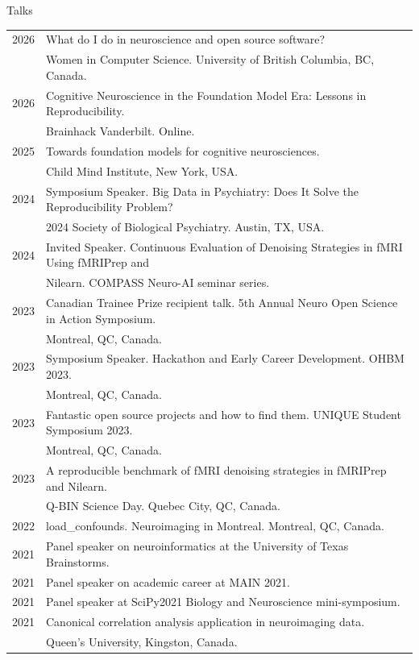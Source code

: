 \documentclass{resume} %
\begin{document}
\begin{rSection}{Talks}
  \begin{tabular}{@{} l l @{\hspace{10ex}}}
    2026 & What do I do in neuroscience and open source software? \\
    & Women in Computer Science. University of British Columbia, BC, Canada. \\
    2026 & Cognitive Neuroscience in the Foundation Model Era: Lessons in Reproducibility. \\
    & Brainhack Vanderbilt. Online. \\
    2025 & Towards foundation models for cognitive neurosciences. \\
 	  &Child Mind Institute, New York, USA. \\
    2024 & Symposium Speaker. Big Data in Psychiatry: Does It Solve the Reproducibility Problem? \\ & 2024 Society of Biological Psychiatry. Austin, TX, USA.\\
    2024 & Invited Speaker. Continuous Evaluation of Denoising Strategies in fMRI Using fMRIPrep and\\
 	  &Nilearn. COMPASS Neuro-AI seminar series.\\
    2023 & Canadian Trainee Prize recipient talk. 5th Annual Neuro Open Science in Action Symposium. \\ & Montreal, QC, Canada.\\
    2023 & Symposium Speaker. Hackathon and Early Career Development. OHBM 2023. \\&Montreal, QC, Canada.\\
    2023 & Fantastic open source projects and how to find them. UNIQUE Student Symposium 2023. \\&Montreal, QC, Canada.\\
    2023 & A reproducible benchmark of fMRI denoising strategies in fMRIPrep and Nilearn. \\ & Q-BIN Science Day. Quebec City, QC, Canada.\\
   	2022 & load\_confounds. Neuroimaging in Montreal. Montreal, QC, Canada.\\
    2021 & Panel speaker on neuroinformatics at the University of Texas Brainstorms.\\
    2021 & Panel speaker on academic career at MAIN 2021. \\
    2021 & Panel speaker at SciPy2021 Biology and Neuroscience mini-symposium. \\
  	2021 & Canonical correlation analysis application in neuroimaging data. \\&Queen's University, Kingston, Canada. \\

\end{tabular}
\end{rSection}
\end{document}
